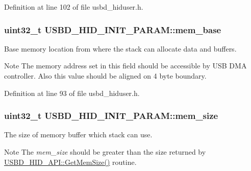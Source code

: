 Definition at line 102 of file usbd\+\_\+hiduser.\+h.

\subsubsection[{\texorpdfstring{mem\+\_\+base}{mem_base}}]{\setlength{\rightskip}{0pt plus 5cm}uint32\+\_\+t U\+S\+B\+D\+\_\+\+H\+I\+D\+\_\+\+I\+N\+I\+T\+\_\+\+P\+A\+R\+A\+M\+::mem\+\_\+base}\hypertarget{structUSBD__HID__INIT__PARAM_aa53ec81868fce2b2ec22b3053f9d000a}{}\label{structUSBD__HID__INIT__PARAM_aa53ec81868fce2b2ec22b3053f9d000a}
Base memory location from where the stack can allocate data and buffers. \begin{DoxyNote}{Note}
The memory address set in this field should be accessible by U\+SB D\+MA controller. Also this value should be aligned on 4 byte boundary. 
\end{DoxyNote}


Definition at line 93 of file usbd\+\_\+hiduser.\+h.

\subsubsection[{\texorpdfstring{mem\+\_\+size}{mem_size}}]{\setlength{\rightskip}{0pt plus 5cm}uint32\+\_\+t U\+S\+B\+D\+\_\+\+H\+I\+D\+\_\+\+I\+N\+I\+T\+\_\+\+P\+A\+R\+A\+M\+::mem\+\_\+size}\hypertarget{structUSBD__HID__INIT__PARAM_a79aeddb1f4f4c9d77cacd17cf6c26499}{}\label{structUSBD__HID__INIT__PARAM_a79aeddb1f4f4c9d77cacd17cf6c26499}
The size of memory buffer which stack can use. \begin{DoxyNote}{Note}
The {\itshape mem\+\_\+size} should be greater than the size returned by \hyperlink{structUSBD__HID__API_a020839a4e29677899bb7a0a2c11b1252}{U\+S\+B\+D\+\_\+\+H\+I\+D\+\_\+\+A\+P\+I\+::\+Get\+Mem\+Size()} routine. 
\end{DoxyNote}



